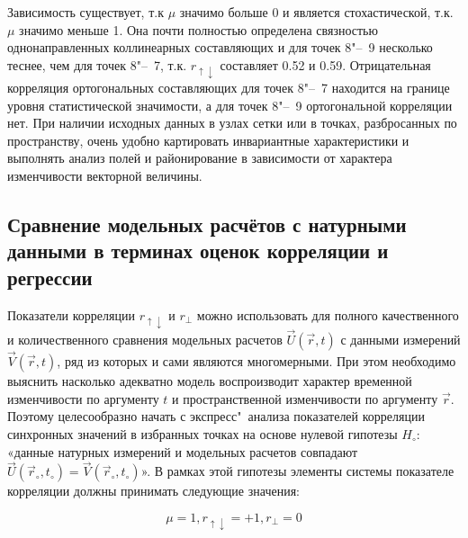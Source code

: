 
Зависимость существует, т.к $\mu$ значимо больше 0 и является стохастической, т.к. $\mu$ значимо меньше 1. Она почти полностью определена связностью однонаправленных коллинеарных составляющих и для точек 8"--~9 несколько теснее, чем для точек 8"--~7, т.к. $r_{\uparrow\downarrow}$ составляет 0.52 и 0.59. Отрицательная корреляция ортогональных составляющих для точек 8"--~7 находится на границе уровня статистической значимости, а для точек 8"--~9 ортогональной корреляции нет.
При наличии исходных данных в узлах сетки или в точках, разбросанных по пространству, очень удобно картировать инвариантные характеристики и выполнять анализ полей и районирование в зависимости от характера изменчивости векторной величины.

\subsection{Сравнение модельных расчётов с натурными данными в терминах оценок корреляции и регрессии}
Показатели корреляции $r_{\uparrow\downarrow}$ и $r_{\perp}$ можно использовать для полного качественного и количественного сравнения модельных расчетов $\vec{U}(\vec{r},t)$ с данными измерений $\vec{V}(\vec{r},t)$, ряд из которых и сами являются многомерными. При этом необходимо выяснить насколько адекватно модель воспроизводит характер временной изменчивости по аргументу $t$ и пространственной изменчивости по аргументу $\vec{r}$. Поэтому целесообразно начать с экспресс"~анализа показателей корреляции синхронных значений в избранных точках на основе нулевой гипотезы $H_{\circ}$: «данные натурных измерений и модельных расчетов совпадают $\vec{U}(\vec{r}_{\circ},t_{\circ})=\vec{V}(\vec{r}_{\circ},t_{\circ})$». В рамках этой гипотезы элементы системы показателе корреляции   должны принимать следующие значения:

\begin{equation}
\label{eq:equation3_26}
{\mu=1, r_{\uparrow\downarrow}=+1, r_{\perp}=0}
\end{equation}  

